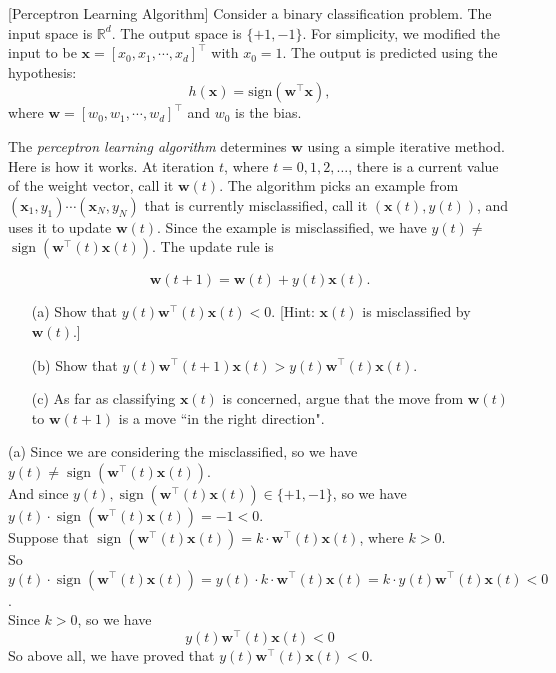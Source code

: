 \item {} [Perceptron Learning Algorithm]
Consider a binary classification problem. The input space is $\mathbb{R}^{d}$. The output space is $\{ +1, -1 \}$. For simplicity, we modified the input to be $\mathbf{x} = [x_0, x_1, \cdots, x_d]^{\top}$ with $x_0=1$. The output is predicted using the hypothesis:
\begin{equation}
    h(\mathbf{x}) = \text{sign}(\mathbf{w}^{\top}\mathbf{x}),
\end{equation}
where $\mathbf{w} = [w_0, w_1, \cdots, w_d]^{\top}$ and $w_0$ is the bias.

The \textit{perceptron learning algorithm} determines $\mathbf{w}$ using a simple iterative method. Here is how it works. At iteration $t$, where $t=0,1,2, \ldots$, there is a current value of the weight vector, call it $\mathbf{w}(t)$. The algorithm picks an example from $\left(\mathbf{x}_1, y_1\right) \cdots\left(\mathbf{x}_N, y_N\right)$ that is currently misclassified, call it $(\mathbf{x}(t), y(t))$, and uses it to update $\mathbf{w}(t)$. Since the example is misclassified, we have $y(t) \neq$ $\operatorname{sign}\left(\mathbf{w}^{\top}(t) \mathbf{x}(t)\right)$. The update rule is

\begin{equation}
    \mathbf{w}(t+1)=\mathbf{w}(t)+y(t) \mathbf{x}(t).
\end{equation}

\begin{itemize}
\item[(a)] Show that $y(t) \mathbf{w}^{\top}(t) \mathbf{x}(t)<0$. [Hint: $\mathbf{x}(t)$ is misclassified by $\mathbf{w}(t)$.] ~
\item[(b)] Show that $y(t) \mathbf{w}^{\top}(t+1) \mathbf{x}(t)>y(t) \mathbf{w}^{\top}(t) \mathbf{x}(t)$. ~
\item[(c)]   As far as classifying $\mathbf{x}(t)$ is concerned, argue that the move from $\mathbf{w}(t)$ to $\mathbf{w}(t+1)$ is a move ``in the right direction". ~
\end{itemize}

\solution

(a) Since we are considering the misclassified, so we have $y(t) \neq \operatorname{sign}\left(\mathbf{w}^{\top}(t) \mathbf{x}(t)\right)$.\\
And since $y(t), \operatorname{sign}\left(\mathbf{w}^{\top}(t) \mathbf{x}(t)\right)\in \{+1, -1\}$, so we have $y(t)\cdot\operatorname{sign}\left(\mathbf{w}^{\top}(t)\mathbf{x}(t)\right)=-1<0$.\\
Suppose that $\operatorname{sign}\left(\mathbf{w}^{\top}(t)\mathbf{x}(t)\right)=k\cdot \mathbf{w}^{\top}(t) \mathbf{x}(t)$, where $k>0$.\\
So $y(t)\cdot\operatorname{sign}\left(\mathbf{w}^{\top}(t)\mathbf{x}(t)\right)=y(t)\cdot k\cdot \mathbf{w}^{\top}(t) \mathbf{x}(t)=k\cdot y(t) \mathbf{w}^{\top}(t) \mathbf{x}(t)<0$.\\
Since $k>0$, so we have
$$y(t) \mathbf{w}^{\top}(t) \mathbf{x}(t)<0$$
So above all, we have proved that $y(t) \mathbf{w}^{\top}(t) \mathbf{x}(t)<0$.

